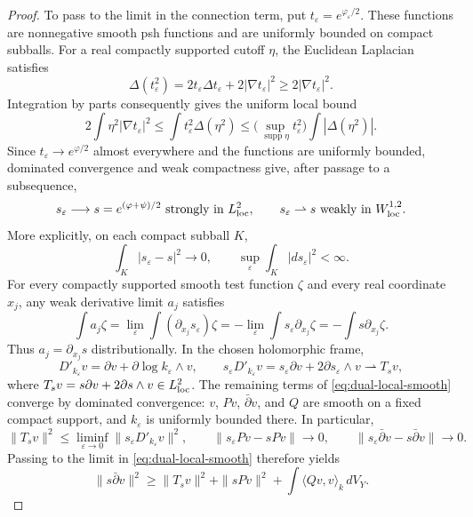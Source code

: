 \documentclass[11pt,reqno]{amsart}
\numberwithin{equation}{section}
\theoremstyle{definition}
\theoremstyle{remark}
\begin{document}
\begin{proof}
To pass to the limit in the connection term, put
$t_\varepsilon=e^{\varphi_\varepsilon/2}$.
These functions are nonnegative smooth psh functions and are uniformly
bounded on compact subballs.  For a real compactly supported cutoff
$\eta$, the Euclidean Laplacian satisfies
\[
 \Delta(t_\varepsilon^2)
 =2t_\varepsilon\Delta t_\varepsilon
       +2|\nabla t_\varepsilon|^2
 \ge2|\nabla t_\varepsilon|^2.
\]
Integration by parts consequently gives the uniform local bound
\[
 2\int\eta^2|\nabla t_\varepsilon|^2
 \le\int t_\varepsilon^2\Delta(\eta^2)
 \le\bigl(\sup_{\operatorname{supp}\eta}t_\varepsilon^2\bigr)
          \int|\Delta(\eta^2)|.
\]
Since $t_\varepsilon\to e^{\varphi/2}$ almost everywhere and the
functions are uniformly bounded, dominated convergence and weak
compactness give, after passage to a subsequence,
\[
 s_\varepsilon\longrightarrow s=e^{(\varphi+\psi)/2}
       \text{ strongly in }L^2_{\rm loc},\qquad
 s_\varepsilon\rightharpoonup s
       \text{ weakly in }W^{1,2}_{\rm loc}.
\]
More explicitly, on each compact subball $K$,
\[
 \int_K|s_\varepsilon-s|^2\longrightarrow0,\qquad
 \sup_\varepsilon\int_K|ds_\varepsilon|^2<\infty.
\]
For every compactly supported smooth test function $\zeta$ and every
real coordinate $x_j$, any weak derivative limit $a_j$ satisfies
\[
 \int a_j\zeta
 =\lim_\varepsilon\int (\partial_{x_j}s_\varepsilon)\zeta
 =-\lim_\varepsilon\int s_\varepsilon\partial_{x_j}\zeta
 =-\int s\partial_{x_j}\zeta.
\]
Thus $a_j=\partial_{x_j}s$ distributionally.
In the chosen holomorphic frame,
\[
 D'_{k_\varepsilon}v
   =\partial v+\partial\log k_\varepsilon\wedge v,\qquad
 s_\varepsilon D'_{k_\varepsilon}v
   =s_\varepsilon\partial v+2\partial s_\varepsilon\wedge v
   \rightharpoonup T_sv,
\]
where $T_sv=s\partial v+2\partial s\wedge v\in L^2_{\rm loc}$.
The remaining terms of \eqref{eq:dual-local-smooth} converge by
dominated convergence: $v$, $Pv$, $\bar\partial v$, and $Q$ are smooth
on a fixed compact support, and $k_\varepsilon$ is uniformly bounded
there.  In particular,
\[
 \|T_sv\|^2\le\liminf_{\varepsilon\to0}
       \|s_\varepsilon D'_{k_\varepsilon}v\|^2,\qquad
 \|s_\varepsilon Pv-sPv\|\longrightarrow0,\qquad
 \|s_\varepsilon\bar\partial v-s\bar\partial v\|\longrightarrow0.
\]
Passing to the limit in \eqref{eq:dual-local-smooth} therefore yields
\begin{equation}\label{eq:dual-local-limit}
 \|s\bar\partial v\|^2\ge\|T_sv\|^2+\|sPv\|^2
                          +\int\langle Qv,v\rangle_k\,dV_Y.
\end{equation}


\end{proof}
\end{document}
